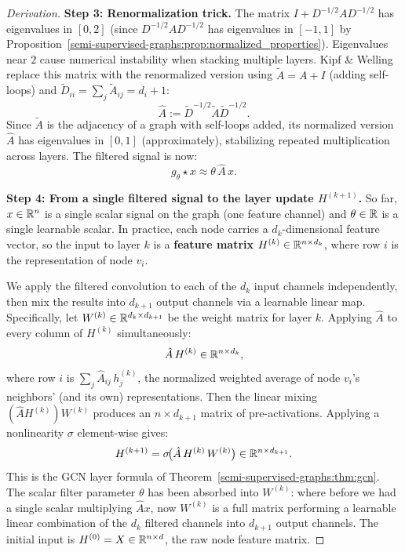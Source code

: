 \begin{notechapter}
\begin{proof}[Derivation]
\textbf{Step 3: Renormalization trick.}
The matrix $I + D^{-1/2}AD^{-1/2}$ has eigenvalues in $[0, 2]$ (since
$D^{-1/2}AD^{-1/2}$ has eigenvalues in $[-1, 1]$ by
Proposition~\ref{semi-supervised-graphs:prop:normalized_properties}). Eigenvalues near $2$ cause
numerical instability when stacking multiple layers. Kipf \& Welling replace
this matrix with the renormalized version using $\tilde{A} = A + I$
(adding self-loops) and $\tilde{D}_{ii} = \sum_j \tilde{A}_{ij} = d_i + 1$:
\[
\hat{A} := \tilde{D}^{-1/2}\tilde{A}\tilde{D}^{-1/2}.
\]
Since $\tilde{A}$ is the adjacency of a graph with self-loops added, its
normalized version $\hat{A}$ has eigenvalues in $[0, 1]$ (approximately),
stabilizing repeated multiplication across layers. The filtered signal is now:
\[
g_\theta \star x \approx \theta\,\hat{A}\,x.
\]

\textbf{Step 4: From a single filtered signal to the layer update $H^{(k+1)}$.}
So far, $x \in \mathbb{R}^n$ is a single scalar signal on the graph (one feature
channel) and $\theta \in \mathbb{R}$ is a single learnable scalar. In practice, each
node carries a $d_k$-dimensional feature vector, so the input to layer $k$ is
a \textbf{feature matrix} $H^{(k)} \in \mathbb{R}^{n \times d_k}$, where row $i$ is
the representation of node $v_i$.

We apply the filtered convolution to each of the $d_k$ input channels
independently, then mix the results into $d_{k+1}$ output channels via a
learnable linear map. Specifically, let $W^{(k)} \in \mathbb{R}^{d_k \times d_{k+1}}$
be the weight matrix for layer $k$. Applying $\hat{A}$ to every column of
$H^{(k)}$ simultaneously:
\[
\hat{A}\,H^{(k)} \in \mathbb{R}^{n \times d_k},
\]
where row $i$ is $\sum_{j} \hat{A}_{ij}\,h_j^{(k)}$, the normalized weighted
average of node $v_i$'s neighbors' (and its own) representations. Then the
linear mixing $(\hat{A}H^{(k)})W^{(k)}$ produces an $n \times d_{k+1}$ matrix
of pre-activations. Applying a nonlinearity $\sigma$ element-wise gives:
\[
H^{(k+1)} = \sigma\!\bigl(\hat{A}\,H^{(k)}\,W^{(k)}\bigr) \in \mathbb{R}^{n \times d_{k+1}}.
\]
This is the GCN layer formula of Theorem~\ref{semi-supervised-graphs:thm:gcn}. The scalar filter
parameter $\theta$ has been absorbed into $W^{(k)}$: where before we had a
single scalar multiplying $\hat{A}x$, now $W^{(k)}$ is a full matrix
performing a learnable linear combination of the $d_k$ filtered channels into
$d_{k+1}$ output channels. The initial input is $H^{(0)} = X \in \mathbb{R}^{n \times d}$,
the raw node feature matrix.
\end{proof}


\end{notechapter}
